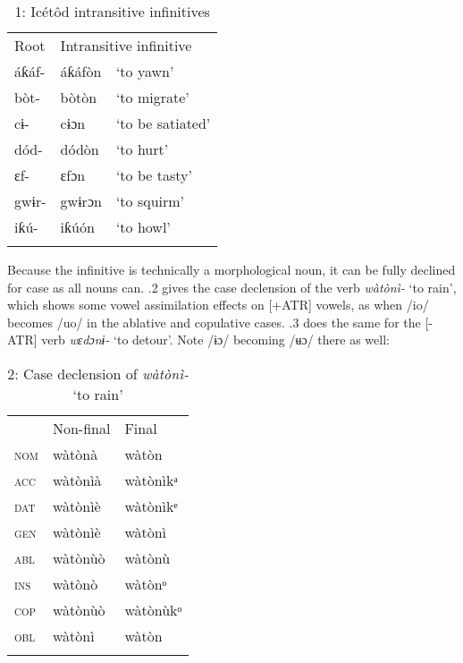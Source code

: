 \begin{table}
\caption{1: Icétôd intransitive infinitives}
\label{tab:8}


\begin{tabularx}{\textwidth}{XXX}
\lsptoprule

Root & \multicolumn{2}{X}{Intransitive infinitive}\\
áƙáf- & áƙáfòn & ‘to yawn’\\
bòt- & bòtòn & ‘to migrate’\\
cɨ- & cɨɔn & ‘to be satiated’\\
dód- & dódòn & ‘to hurt’\\
ɛf- & ɛfɔn & ‘to be tasty’\\
gwɨr- & gwɨrɔn & ‘to squirm’\\
iƙú- & iƙúón & ‘to howl’\\
\lspbottomrule
\end{tabularx}
\end{table}
Because the infinitive is technically a morphological noun, it can be fully declined for case as all nouns can. .2 gives the case declension of the verb \textit{wàtònì- }‘to rain’, which shows some vowel assimilation effects on [+ATR] vowels, as when /io/ becomes /uo/ in the ablative and copulative cases. .3 does the same for the [-ATR] verb \textit{wɛdɔnɨ- }‘to detour’. Note /ɨɔ/ becoming /ʉɔ/ there as well:


\begin{table}
\caption{2: Case declension of \textit{wàtònì- }‘to rain’}
\label{tab:8}


\begin{tabularx}{\textwidth}{XXX} & Non-final & Final\\
\lsptoprule
\textsc{nom} & wàtònà & wàtòn\\
\textsc{acc} & wàtònìà & wàtònìkᵃ\\
\textsc{dat} & wàtònìè & wàtònìkᵉ\\
\textsc{gen} & wàtònìè & wàtònì\\
\textsc{abl} & wàtònùò & wàtònù\\
\textsc{ins} & wàtònò & wàtònᵒ\\
\textsc{cop} & wàtònùò & wàtònùkᵒ\\
\textsc{obl} & wàtònì & wàtòn\\
\lspbottomrule
\end{tabularx}
\end{table}

